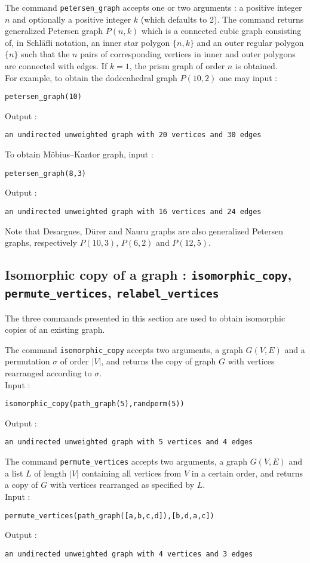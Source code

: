\documentclass[a4paper,11pt]{article}
\begin{document}
The command {\tt petersen\_graph} accepts one or two arguments : a positive integer $ n $ and optionally a positive integer $ k $ (which defaults to 2). The command returns generalized Petersen graph $ P(n,k) $ which is a connected cubic graph consisting of, in Schl\"afli notation, an inner star polygon $ \{n,k\} $ and an outer regular polygon $ \{n\} $ such that the $ n  $ pairs of corresponding vertices in inner and outer polygons are connected with edges. If $ k=1 $, the prism graph of order $ n $ is obtained.\\
For example, to obtain the dodecahedral graph $ P(10,2) $ one may input :
\begin{center}
  \tt petersen\_graph(10)
\end{center}
Output :
\begin{center}
  \tt an undirected unweighted graph with 20 vertices and 30 edges
\end{center}
To obtain M\"obius--Kantor graph, input :
\begin{center}
  \tt petersen\_graph(8,3)
\end{center}
Output :
\begin{center}
  \tt an undirected unweighted graph with 16 vertices and 24 edges
\end{center}
Note that Desargues, D\"urer and Nauru graphs are also generalized Petersen graphs, respectively $ P(10,3) $, $ P(6,2) $ and $ P(12,5) $.

\subsection{Isomorphic copy of a graph : {\tt isomorphic\_copy}, {\tt permute\_vertices}, {\tt relabel\_vertices}}

The three commands presented in this section are used to obtain isomorphic copies of an existing graph. 

The command {\tt isomorphic\_copy} accepts two arguments, a graph $ G(V,E) $ and a permutation $ \sigma $ of order $ |V| $, and returns the copy of graph $ G $ with vertices rearranged according to $ \sigma $.\\
Input :
\begin{center}
  \tt isomorphic\_copy(path\_graph(5),randperm(5))
\end{center}
Output :
\begin{center}
  \tt an undirected unweighted graph with 5 vertices and 4 edges
\end{center}

The command {\tt permute\_vertices} accepts two arguments, a graph $ G(V,E) $ and a list $ L $ of length $ |V| $ containing all vertices from $ V $ in a certain order, and returns a copy of $ G $ with vertices rearranged as specified by $ L $.\\
Input :
\begin{center}
  \tt permute\_vertices(path\_graph([a,b,c,d]),[b,d,a,c])
\end{center}
Output :
\begin{center}
  \tt an undirected unweighted graph with 4 vertices and 3 edges
\end{center}
\end{document}
